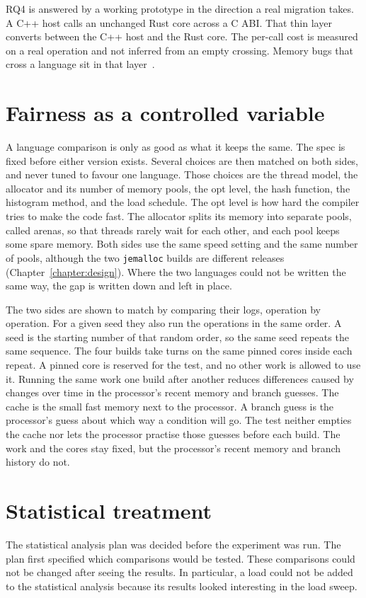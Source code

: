 \documentclass[english,oneside,a4paper,censored,csm,software-track-2020]{HYthesisML}
\begin{document}
RQ4 is answered by a working
prototype in the direction a real migration takes. A C++ host calls an
unchanged Rust core across a C ABI. That thin layer converts between the C++ host and the Rust core.
The per-call cost is measured on a real
operation and not inferred from an empty crossing. Memory bugs that cross a
language sit in that layer~\cite{li2022crosslang}.

\section{Fairness as a controlled variable}\label{sec:controlsbrief}
A language comparison is only as good as what it keeps the same. The spec
is fixed before either version exists. Several choices are then matched on
both sides, and never tuned to favour one language. Those choices are the
thread model, the allocator and its number of memory pools, the opt level,
the hash function, the histogram method, and the load schedule. The opt level
is how hard the compiler tries to make the code fast. The allocator splits its
memory into separate pools, called arenas, so that threads rarely wait for each
other, and each pool keeps some spare memory. Both sides use the same speed
setting and the same number of pools, although the two \texttt{jemalloc} builds are different
releases (Chapter~\ref{chapter:design}). Where the two languages could not be
written the same way, the gap is written down and left in place.

The two sides are shown to match by comparing their logs, operation by
operation. For a given seed they also run the operations in the same order.
A seed is the starting number of that random order, so the same seed repeats
the same sequence. The four builds take turns on the same pinned cores
inside each repeat. A pinned core is reserved for the test, and no other work
is allowed to use it. Running the same work one build after another reduces
differences caused by changes over time in the processor's recent memory and
branch guesses. The cache is the small fast memory next to the processor. A
branch guess is the processor's guess about which way a condition will go.
The test neither empties the cache nor lets the processor practise those
guesses before each build. The work and the cores stay fixed, but the
processor's recent memory and branch history do not.

\section{Statistical treatment}\label{sec:statsbrief}
The statistical analysis plan was decided before the experiment was run. The plan first
specified which comparisons would be tested. These comparisons could not be changed
after seeing the results. In particular, a load could not be added to the statistical
analysis because its results looked interesting in the load sweep.
\end{document}
